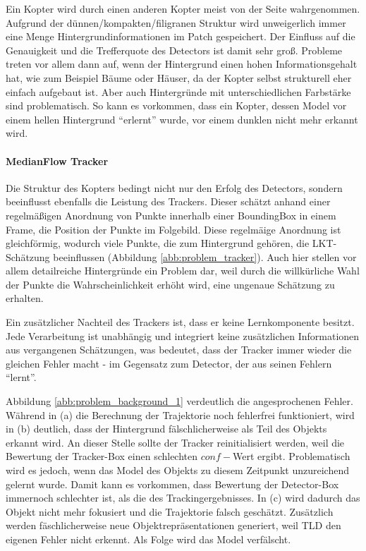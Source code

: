 	Ein Kopter wird durch einen anderen Kopter meist von der Seite wahrgenommen. Aufgrund der dünnen/kompakten/filigranen Struktur wird unweigerlich immer eine Menge Hintergrundinformationen im Patch gespeichert. Der Einfluss auf die Genauigkeit und die Trefferquote des Detectors ist damit sehr groß. Probleme treten vor allem dann auf, wenn der Hintergrund einen hohen Informationsgehalt hat, wie zum Beispiel Bäume oder Häuser, da der Kopter selbst strukturell eher einfach aufgebaut ist. Aber auch Hintergründe mit unterschiedlichen Farbstärke sind problematisch. So kann es vorkommen, dass ein Kopter, dessen Model vor einem hellen Hintergrund ``erlernt'' wurde, vor einem dunklen nicht mehr erkannt wird.


	\paragraph{MedianFlow Tracker}
	Die Struktur des Kopters bedingt nicht nur den Erfolg des Detectors, sondern beeinflusst ebenfalls die Leistung des Trackers. Dieser schätzt anhand einer regelmäßigen Anordnung von Punkte innerhalb einer BoundingBox in einem Frame, die Position der Punkte im Folgebild. Diese regelmäige Anordnung ist gleichförmig, wodurch viele Punkte, die zum Hintergrund gehören, die LKT-Schätzung beeinflussen (Abbildung \ref{abb:problem_tracker}). Auch hier stellen vor allem detailreiche Hintergründe ein Problem dar, weil durch die willkürliche Wahl der Punkte die Wahrscheinlichkeit erhöht wird, eine ungenaue Schätzung zu erhalten.

	Ein zusätzlicher Nachteil des Trackers ist, dass er keine Lernkomponente besitzt. Jede Verarbeitung ist unabhängig und integriert keine zusätzlichen Informationen aus vergangenen Schätzungen, was bedeutet, dass der Tracker immer wieder die gleichen Fehler macht - im Gegensatz zum Detector, der aus seinen Fehlern ``lernt''.

	Abbildung \ref{abb:problem_background_1} verdeutlich die angesprochenen Fehler. Während in (a) die Berechnung der Trajektorie noch fehlerfrei funktioniert, wird in (b) deutlich, dass der Hintergrund fälschlicherweise als Teil des Objekts erkannt wird. An dieser Stelle sollte der Tracker reinitialisiert werden, weil die Bewertung der Tracker-Box einen schlechten $conf-$Wert ergibt. Problematisch wird es jedoch, wenn das Model des Objekts zu diesem Zeitpunkt unzureichend gelernt wurde. Damit kann es vorkommen, dass Bewertung der Detector-Box immernoch schlechter ist, als die des Trackingergebnisses. In (c) wird dadurch das Objekt nicht mehr fokusiert und die Trajektorie falsch geschätzt. Zusätzlich werden fäschlicherweise neue Objektrepräsentationen generiert, weil TLD den eigenen Fehler nicht erkennt. Als Folge wird das Model verfälscht.

